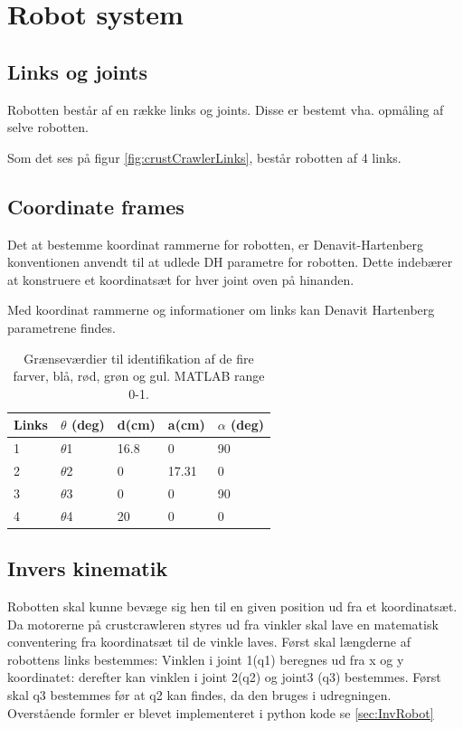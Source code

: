 \section{Robot system}
\subsection{Links og joints}
Robotten består af en række links og joints. Disse er bestemt vha. opmåling af selve robotten. 


Som det ses på figur \ref{fig:crustCrawlerLinks}, består robotten af 4 links. 

\subsection{Coordinate frames}
Det at bestemme koordinat rammerne for robotten, er Denavit-Hartenberg konventionen anvendt til at udlede DH parametre for robotten. Dette indebærer at konstruere et koordinatsæt for hver joint oven på hinanden. 


Med koordinat rammerne og informationer om links kan Denavit Hartenberg parametrene findes. 

\begin{table}[H]
\centering
\begin{tabular}{l|l|l|l|l}
Links	&	$\theta$ (deg) 	&	d(cm)		&	a(cm)		& 	$\alpha$ (deg)\\
\hline
1		&	$\theta$1			&	16.8			&	0			&	90\\
2		&	$\theta$2			&	0			&	17.31		&	0\\
3		&	$\theta$3			&	0			&	0			&	90\\
4		&	$\theta$4			&	20		&	0			&	0\\
\end{tabular}	
\caption{Grænseværdier til identifikation af de fire farver, blå, rød, grøn og gul. MATLAB range 0-1.}
\end{table}

\subsection{Invers kinematik}
Robotten skal kunne bevæge sig hen til en given position ud fra et koordinatsæt. Da motorerne på crustcrawleren styres ud fra vinkler skal lave
en matematisk conventering fra koordinatsæt til de vinkle laves.\newline
Først skal længderne af robottens links bestemmes:
Vinklen i joint 1(q1) beregnes ud fra x og y koordinatet:
derefter kan vinklen i joint 2(q2) og joint3 (q3) bestemmes. Først skal q3 bestemmes før at q2 kan findes, da den bruges i udregningen.
Overstående formler er blevet implementeret i python kode se \vref{sec:InvRobot}





